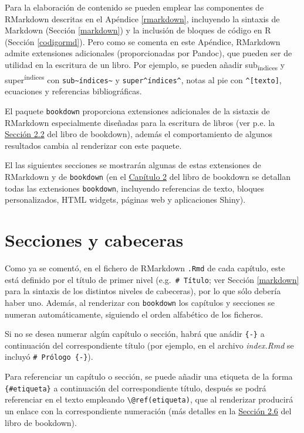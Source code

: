 \documentclass[
]{book}
\theoremstyle{definition}
\theoremstyle{definition}
\theoremstyle{definition}
\theoremstyle{definition}
\theoremstyle{remark}
\begin{document}
Para la elaboración de contenido se pueden emplear las componentes de RMarkdown
descritas en el Apéndice \ref{rmarkdown}, incluyendo la sintaxis de Markdown (Sección \ref{markdown})
y la inclusión de bloques de código en R (Sección \ref{codigormd}).
Pero como se comenta en este Apéndice, RMarkdown admite extensiones adicionales (proporcionadas por Pandoc),
que pueden ser de utilidad en la escritura de un libro.
Por ejemplo, se pueden añadir sub\textsubscript{índices} y super\textsuperscript{índices} con \texttt{sub\textasciitilde{}índices\textasciitilde{}} y \texttt{super\^{}índices\^{}}, notas al pie con \texttt{\^{}{[}texto{]}}, ecuaciones y referencias bibliográficas.

El paquete \texttt{bookdown} proporciona extensiones adicionales de la sistaxis de RMarkdown
especialmente diseñadas para la escritura de libros (ver p.e. la
\href{https://bookdown.org/yihui/bookdown/markdown-extensions-by-bookdown.html}{Sección 2.2}
del libro de bookdown), además el comportamiento de algunos resultados
cambia al renderizar con este paquete.

El las siguientes secciones se mostrarán algunas de estas extensiones de RMarkdown y de \texttt{bookdown}
(en el \href{https://bookdown.org/yihui/bookdown/markdown-extensions-by-bookdown.html}{Capítulo 2}
del libro de bookdown se detallan todas las extensiones \texttt{bookdown}, incluyendo referencias de texto,
bloques personalizados, HTML widgets, páginas web y aplicaciones Shiny).

\hypertarget{secciones-y-cabeceras}{%
\section{Secciones y cabeceras}\label{secciones-y-cabeceras}}

Como ya se comentó, en el fichero de RMarkdown \texttt{.Rmd} de cada capítulo,
este está definido por el título de primer nivel (e.g.~\texttt{\#\ Título};
ver Sección \ref{markdown} para la sintaxis de los distintos niveles de cabeceras),
por lo que sólo debería haber uno.
Además, al renderizar con \texttt{bookdown} los capítulos y secciones se numeran automáticamente, siguiendo el orden alfabético de los ficheros.

Si no se desea numerar algún capítulo o sección, habrá que anádir \texttt{\{-\}} a continuación del correspondiente título (por ejemplo, en el archivo \emph{index.Rmd} se incluyó \texttt{\#\ Prólogo\ \{-\}}).

Para referenciar un capítulo o sección, se puede añadir una etiqueta de la forma
\texttt{\{\#etiqueta\}} a continuación del correspondiente título,
después se podrá referenciar en el texto empleando \texttt{\textbackslash{}@ref(etiqueta)},
que al renderizar producirá un enlace con la correspondiente numeración
(más detalles en la \href{https://bookdown.org/yihui/bookdown/cross-references.html}{Sección 2.6} del libro de bookdown).
\end{document}
